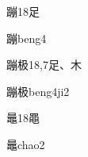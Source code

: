 \begin{Entry}{蹦}{18}{⾜}
  \begin{Phonetics}{蹦}{beng4}
  \end{Phonetics}
\end{Entry}

\begin{Entry}{蹦极}{18,7}{⾜、⽊}
  \begin{Phonetics}{蹦极}{beng4ji2}
  \end{Phonetics}
\end{Entry}

\begin{Entry}{鼂}{18}{⿌}
  \begin{Phonetics}{鼂}{chao2}
  \end{Phonetics}
\end{Entry}


